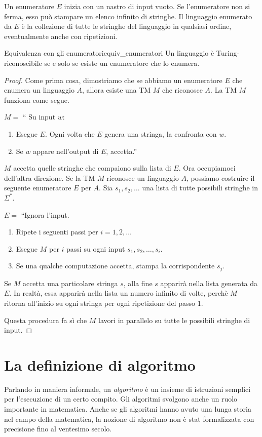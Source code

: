 \documentclass[12pt]{report}
\newcounter{theorem}
\newcommand{\nmu}{}
\begin{document}
Un enumeratore $E$ inizia con un nastro di input vuoto. Se l'enumeratore non si ferma, esso può stampare un elenco infinito di stringhe. Il linguaggio enumerato da $E$ è la collezione di tutte le stringhe del linguaggio in qualsiasi ordine, eventualmente anche con ripetizioni.
\begin{theorem}{\nmu Equivalenza con gli enumeratori}{equiv_enumeratori}
	Un linguaggio è Turing-riconoscibile se e solo se esiste un enumeratore che lo enumera.
\end{theorem}
\begin{proof}
	Come prima cosa, dimostriamo che se abbiamo un enumeratore $E$ che enumera un linguaggio $A$, allora esiste una TM $M$ che riconosce $A$. La TM $M$ funziona come segue.

	$M = $ `` Su input $w$:
	\begin{enumerate}
		\item Esegue $E$. Ogni volta che $E$ genera una stringa, la confronta con $w$.
		\item Se $w$ appare nell'output di $E$, accetta.''
	\end{enumerate}
	$M$ accetta quelle stringhe che compaiono sulla lista di $E$. Ora occupiamoci dell'altra direzione. Se la TM $M$ riconosce un linguaggio $A$, possiamo costruire il seguente enumeratore $E$ per $A$. Sia $s_1, s_2, \dots$ una lista di tutte possibili stringhe in $\Sigma^*$.

	$E = $ ``Ignora l'input.
	\begin{enumerate}
		\item Ripete i seguenti passi per $i = 1, 2, \dots$
		\item Esegue $M$ per $i$ passi su ogni input $s_1, s_2, \dots, s_i$.
		\item Se una qualche computazione accetta, stampa la corrispondente $s_j$.
	\end{enumerate}

	Se $M$ accetta una particolare stringa $s$, alla fine $s$ apparirà nella lista generata da $E$. In realtà, essa apparirà nella lista un numero infinito di volte, perchè $M$ ritorna all'inizio su ogni stringa per ogni ripetizione del passo 1.

	Questa procedura fa sì che $M$ lavori in parallelo su tutte le possibili stringhe di input.
\end{proof}
\section{La definizione di algoritmo}
Parlando in maniera informale, un \textit{algoritmo} è un insieme di istruzioni semplici per l'esecuzione di un certo compito. Gli algoritmi svolgono anche un ruolo importante in matematica. Anche se gli algoritmi hanno avuto una lunga storia nel campo della matematica, la nozione di algoritmo non è stat formalizzata con precisione fino al ventesimo secolo.
\end{document}
